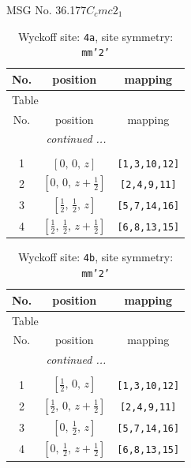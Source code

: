 \documentclass[fleqn,8pt]{jsarticle}
\begin{document}
\setcounter{MaxMatrixCols}{32}

\renewcommand{\tablename}{Table~}
\renewcommand{\figurename}{Figure~}
\begin{center}
\LARGE
MSG No. 36.177\quad$C_{c}mc2_{1}$
\end{center}
\renewcommand{\arraystretch}{1.2}
\begin{longtable}{ccc}
\caption{Wyckoff site: {\tt 4a}, site symmetry: {\tt mm'2'}}
 \\
 \hline \hline
No. & position & mapping \\ \hline \endfirsthead

\multicolumn{2}{l}{\tablename\ \thetable{}} \\
 \hline \hline
No. & position & mapping \\ \hline \endhead

 \hline \hline
\multicolumn{2}{r}{\footnotesize\it continued ...} \\ \endfoot

 \hline \hline
\multicolumn{2}{r}{} \\ \endlastfoot

1 & $\left[ 0,\, 0,\, z \right]$ & {\tt [1,3,10,12]} \\ \hline
2 & $\left[ 0,\, 0,\, z + \frac{1}{2} \right]$ & {\tt [2,4,9,11]} \\ \hline
3 & $\left[ \frac{1}{2},\, \frac{1}{2},\, z \right]$ & {\tt [5,7,14,16]} \\ \hline
4 & $\left[ \frac{1}{2},\, \frac{1}{2},\, z + \frac{1}{2} \right]$ & {\tt [6,8,13,15]} \\
\end{longtable}
\renewcommand{\arraystretch}{1.2}
\begin{longtable}{ccc}
\caption{Wyckoff site: {\tt 4b}, site symmetry: {\tt mm'2'}}
 \\
 \hline \hline
No. & position & mapping \\ \hline \endfirsthead

\multicolumn{2}{l}{\tablename\ \thetable{}} \\
 \hline \hline
No. & position & mapping \\ \hline \endhead

 \hline \hline
\multicolumn{2}{r}{\footnotesize\it continued ...} \\ \endfoot

 \hline \hline
\multicolumn{2}{r}{} \\ \endlastfoot

1 & $\left[ \frac{1}{2},\, 0,\, z \right]$ & {\tt [1,3,10,12]} \\ \hline
2 & $\left[ \frac{1}{2},\, 0,\, z + \frac{1}{2} \right]$ & {\tt [2,4,9,11]} \\ \hline
3 & $\left[ 0,\, \frac{1}{2},\, z \right]$ & {\tt [5,7,14,16]} \\ \hline
4 & $\left[ 0,\, \frac{1}{2},\, z + \frac{1}{2} \right]$ & {\tt [6,8,13,15]} \\
\end{longtable}
\end{document}
